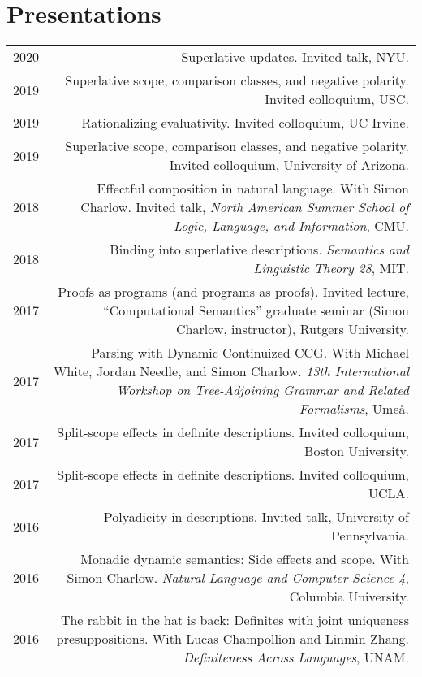 \documentclass[12pt]{article}
\begin{document}
\medskip

\section*{Presentations}

\begin{longtable}{LR}
  2020 & Superlative updates.
         Invited talk, NYU.\\
  2019 & Superlative scope, comparison classes, and negative polarity.
         Invited colloquium, USC.\\
  2019 & Rationalizing evaluativity.
         Invited colloquium, UC Irvine.\\
  2019 & Superlative scope, comparison classes, and negative polarity.
         Invited colloquium, University of Arizona.\\
  2018 & Effectful composition in natural language.
         With Simon Charlow.
         Invited talk, \textit{North American Summer School of Logic, Language,
         and Information}, CMU.\\
  2018 & Binding into superlative descriptions.
         \textit{Semantics and Linguistic Theory 28}, MIT.\\
  2017 & Proofs as programs (and programs as proofs).
         Invited lecture, ``Computational Semantics''
         graduate seminar (Simon Charlow, instructor), Rutgers University.\\
  2017 & Parsing with Dynamic Continuized CCG.
         With Michael White, Jordan Needle, and Simon Charlow.
         \textit{13th International Workshop on Tree-Adjoining Grammar and
         Related Formalisms}, Ume\aa.\\
  2017 & Split-scope effects in definite descriptions.
         Invited colloquium, Boston University.\\
  2017 & Split-scope effects in definite descriptions.
         Invited colloquium, UCLA.\\
  2016 & Polyadicity in descriptions.
         Invited talk, University of Pennsylvania.\\
  2016 & Monadic dynamic semantics: Side effects and scope.
         With Simon Charlow.
         \textit{Natural Language and Computer Science 4}, Columbia University.\\
  2016 & The rabbit in the hat is back: Definites with joint uniqueness
         presuppositions.
         With Lucas Champollion and Linmin Zhang.
         \textit{Definiteness Across Languages}, UNAM.\\

\end{longtable}
\end{document}
